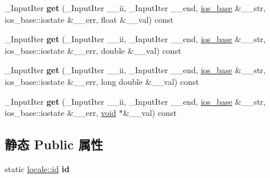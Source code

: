 \begin{DoxyCompactItemize}
\mbox{\label{classnum__get_a2692b8c3a2dfc5c3bdb4d3c2207d3876}} 
\+\_\+\+Input\+Iter {\bfseries get} (\+\_\+\+Input\+Iter \+\_\+\+\_\+ii, \+\_\+\+Input\+Iter \+\_\+\+\_\+end, \hyperlink{classios__base}{ios\+\_\+base} \&\+\_\+\+\_\+str, ios\+\_\+base\+::iostate \&\+\_\+\+\_\+err, float \&\+\_\+\+\_\+val) const
\item 
\mbox{\label{classnum__get_aa3b8046aa4760018d03a18ee1b079e3f}} 
\+\_\+\+Input\+Iter {\bfseries get} (\+\_\+\+Input\+Iter \+\_\+\+\_\+ii, \+\_\+\+Input\+Iter \+\_\+\+\_\+end, \hyperlink{classios__base}{ios\+\_\+base} \&\+\_\+\+\_\+str, ios\+\_\+base\+::iostate \&\+\_\+\+\_\+err, double \&\+\_\+\+\_\+val) const
\item 
\mbox{\label{classnum__get_ace4e4d87ee64d8006b1ecc6647c825e1}} 
\+\_\+\+Input\+Iter {\bfseries get} (\+\_\+\+Input\+Iter \+\_\+\+\_\+ii, \+\_\+\+Input\+Iter \+\_\+\+\_\+end, \hyperlink{classios__base}{ios\+\_\+base} \&\+\_\+\+\_\+str, ios\+\_\+base\+::iostate \&\+\_\+\+\_\+err, long double \&\+\_\+\+\_\+val) const
\item 
\mbox{\label{classnum__get_a6604c454be8664ba612d6fd4689bc138}} 
\+\_\+\+Input\+Iter {\bfseries get} (\+\_\+\+Input\+Iter \+\_\+\+\_\+ii, \+\_\+\+Input\+Iter \+\_\+\+\_\+end, \hyperlink{classios__base}{ios\+\_\+base} \&\+\_\+\+\_\+str, ios\+\_\+base\+::iostate \&\+\_\+\+\_\+err, \hyperlink{interfacevoid}{void} $\ast$\&\+\_\+\+\_\+val) const
\end{DoxyCompactItemize}
\subsection*{静态 Public 属性}
\begin{DoxyCompactItemize}
\item 
\mbox{\label{classnum__get_a4790797be0ebdfbcfa401e9d67813cc9}} 
static \hyperlink{classlocale_1_1id}{locale\+::id} {\bfseries id}
\end{DoxyCompactItemize}
